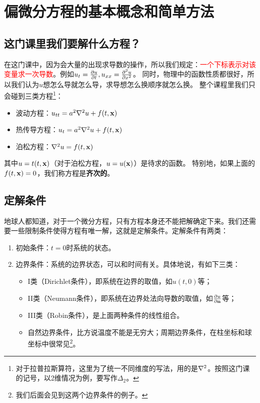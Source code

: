 \chapter{偏微分方程的基本概念和简单方法}
\section{这门课里我们要解什么方程？}
在这门课中，因为会大量的出现求导数的操作，所以我们规定：\textcolor{red}{一个下标表示对该变量求一次导数}。例如$u_t = \pdv{u}{t}, u_{xx} = \pdv[2]{u}{x}$。
同时，物理中的函数性质都很好，所以我们认为$u$想怎么导就怎么导，求导想怎么换顺序就怎么换。
整个课程里我们只会碰到三类方程\footnote{对于拉普拉斯算符，这里为了统一不同维度的写法，用的是$\laplacian{}$。按照这门课的记号，以2维情况为例，要写作$\Delta_2$。}：
\begin{itemize}
    \item 波动方程：$u_{tt} = a^2 \laplacian{u} + f(t, \vb{x})$
    \item 热传导方程：$u_{t} = a^2 \laplacian{u} + f(t, \vb{x})$
    \item 泊松方程：$\laplacian{u} = f(t, \vb{x})$
\end{itemize}
其中$u = t(t, \vb{x})$（对于泊松方程，$u = u(\vb{x})$）是待求的函数。
特别地，如果上面的$f(t, \vb{x}) = 0$，我们称方程是\textbf{齐次的}。

\section{定解条件}
地球人都知道，对于一个微分方程，只有方程本身还不能把解确定下来。我们还需要一些限制条件使得方程有唯一解，这就是定解条件。定解条件有两类：
\begin{enumerate}
    \item 初始条件：$t = 0$时系统的状态。
    \item 边界条件：系统的边界状态，可以和时间有关。具体地说，有如下三类：
        \begin{itemize}
            \item I类（Dirichlet条件），即系统在边界的取值，如$u(t, 0)$等；
            \item II类（Neumann条件），即系统在边界处法向导数的取值，如$\pdv{u}{\vb{n}}$等；
            \item III类（Robin条件），是上面两种条件的线性组合。
            \item 自然边界条件，比方说温度不能是无穷大；周期边界条件，在柱坐标和球坐标中很常见\footnote{我们后面会见到这两个边界条件的例子。}。
        \end{itemize}
\end{enumerate}

